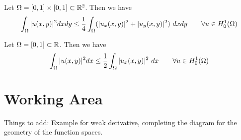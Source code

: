 \begin{example}
	Let $ \Omega = [0,1]\times [0,1] \subset \mathbb{R}^2$. Then we have
	\[ \int_\Omega|u(x,y)|^2 dxdy \leq \frac{1}{4} \int_\Omega (|u_x(x,y)|^2 + |u_y(x,y)|^2)\ dxdy \qquad \forall u \in H_0^1(\Omega) \]
\end{example}

\begin{example}
	Let $ \Omega = [0,1] \subset \mathbb{R} $. Then we have
	\[ \int_\Omega|u(x,y)|^2 dx \leq \frac{1}{2} \int_\Omega |u_x(x,y)|^2 \ dx \qquad \forall u \in H_0^1(\Omega) \]
\end{example}










\section{Working Area}
Things to add: Example for weak derivative, completing the diagram for the geometry of the function spaces. 